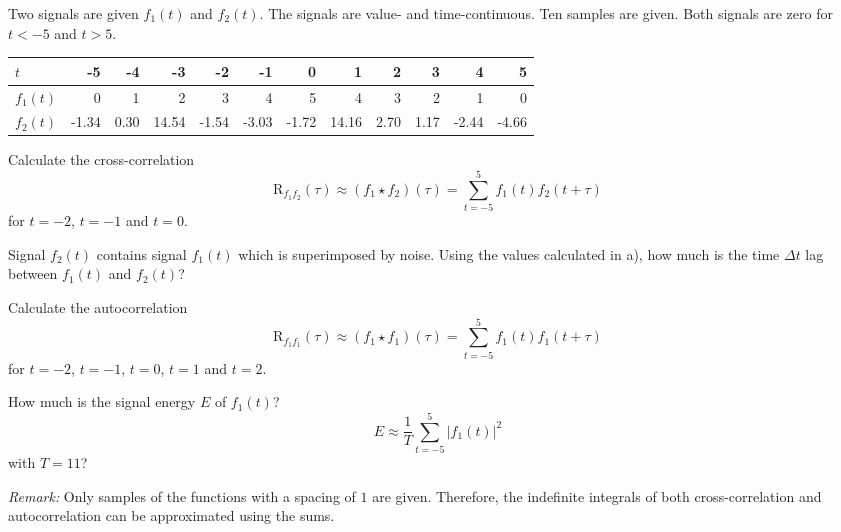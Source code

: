 \begin{question}[subtitle={Cross-Correlation and Autocorrelation}]
	Two signals are given $f_1(t)$ and $f_2(t)$. The signals are value- and time-continuous. Ten samples are given. Both signals are zero for $t < -5$ and $t > 5$.
	\begin{table}[H]
		\centering
		\begin{tabular}{|l|r|r|r|r|r|r|r|r|r|r|r|}
			\hline
			$t$ & -5 & -4 & -3 & -2 & -1 & 0 & 1 & 2 & 3 & 4 & 5 \\
			\hline
			\hline
			$f_1(t)$ & 0 & 1 & 2 & 3 & 4 & 5 & 4 & 3 & 2 & 1 & 0 \\
			$f_2(t)$ & -1.34 & 0.30 & 14.54 & -1.54 & -3.03 & -1.72 & 14.16 & 2.70 & 1.17 & -2.44 & -4.66 \\
			\hline
		\end{tabular}
	\end{table}
	\begin{tasks}
		\task
		Calculate the cross-correlation
		\begin{equation*}
			\mathrm{R}_{f_1 f_2}(\tau) \approx \left(f_1 \star f_2\right)(\tau) = \sum\limits_{t=-5}^{5} f_1(t) f_2(t + \tau)
		\end{equation*}
		for $t = -2$, $t = -1$ and $t = 0$.
		
		\task
		Signal $f_2(t)$ contains signal $f_1(t)$ which is superimposed by noise. Using the values calculated in a), how much is the time $\Delta t$ lag between $f_1(t)$ and $f_2(t)$?
		
		\task
		Calculate the autocorrelation
		\begin{equation*}
			\mathrm{R}_{f_1 f_1}(\tau) \approx \left(f_1 \star f_1\right)(\tau) = \sum\limits_{t=-5}^{5} f_1(t) f_1(t + \tau)
		\end{equation*}
		for $t = -2$, $t = -1$, $t = 0$, $t = 1$ and $t = 2$.
		
		\task
		How much is the signal energy $E$ of $f_1(t)$?
		\begin{equation*}
			E \approx \frac{1}{T} \sum\limits_{t=-5}^{5} \left|f_1(t)\right|^2
		\end{equation*}
		with $T = 11$?
	\end{tasks}

	\textit{Remark:} Only samples of the functions with a spacing of $1$ are given. Therefore, the indefinite integrals of both cross-correlation and autocorrelation can be approximated using the sums.
\end{question}

